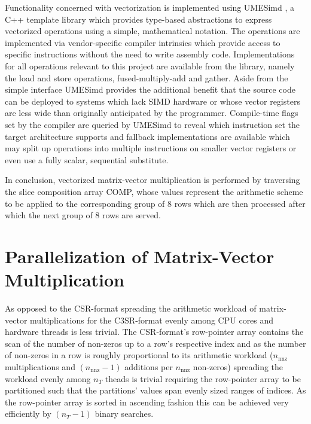     Functionality concerned with vectorization is implemented using UMESimd \cite{umesimd2017}, a C++ template library
    which provides type-based abstractions to express vectorized operations using a simple, mathematical notation. The
    operations are implemented via vendor-specific compiler intrinsics which provide access to specific instructions
    without the need to write assembly code. Implementations for all operations relevant to this project are available
    from the library, namely the load and store operations, fused-multiply-add and gather. Aside from the simple
    interface UMESimd provides the additional benefit that the source code can be deployed to systems which lack SIMD
    hardware or whose vector registers are less wide than originally anticipated by the programmer. Compile-time flags
    set by the compiler are queried by UMESimd to reveal which instruction set the target architecture supports and
    fallback implementations are available which may split up operations into multiple instructions on smaller vector
    registers or even use a fully scalar, sequential substitute.

    In conclusion, vectorized matrix-vector multiplication is performed by traversing the slice composition array
    COMP, whose values represent the arithmetic scheme to be applied to the corresponding group of $8$ rows which are
    then processed after which the next group of $8$ rows are served.




  \section{Parallelization of Matrix-Vector Multiplication}

    As opposed to the CSR-format spreading the arithmetic workload of matrix-vector multiplications for the C3SR-format
    evenly among CPU cores and hardware threads is less trivial. The CSR-format's row-pointer array contains the scan of
    the number of non-zeros up to a row's respective index and as the number of non-zeros in a row is roughly
    proportional to its arithmetic workload ($n_\text{nnz}$ multiplications and $(n_\text{nnz} - 1)$ additions per
    $n_\text{nnz}$ non-zeros) spreading the workload evenly among $n_T$ theads is trivial requiring the row-pointer
    array to be partitioned such that the partitions' values span evenly sized ranges of indices. As the row-pointer
    array is sorted in ascending fashion this can be achieved very efficiently by $(n_T - 1)$ binary searches.

